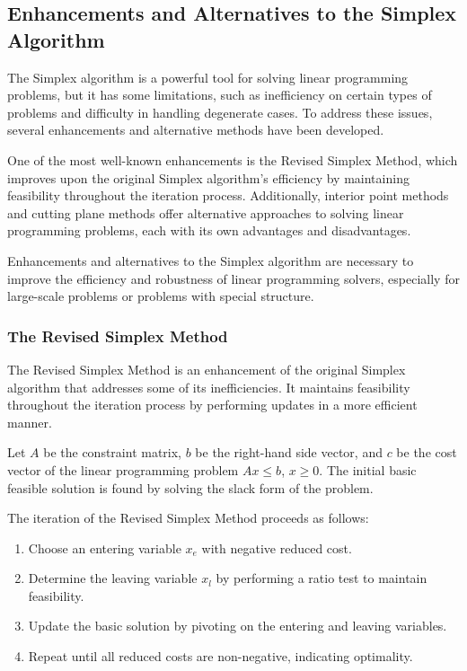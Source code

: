 \documentclass[12pt]{book} %
\begin{document}
\subsection{Enhancements and Alternatives to the Simplex Algorithm}
The Simplex algorithm is a powerful tool for solving linear programming problems, but it has some limitations, such as inefficiency on certain types of problems and difficulty in handling degenerate cases. To address these issues, several enhancements and alternative methods have been developed.

One of the most well-known enhancements is the Revised Simplex Method, which improves upon the original Simplex algorithm's efficiency by maintaining feasibility throughout the iteration process. Additionally, interior point methods and cutting plane methods offer alternative approaches to solving linear programming problems, each with its own advantages and disadvantages.

Enhancements and alternatives to the Simplex algorithm are necessary to improve the efficiency and robustness of linear programming solvers, especially for large-scale problems or problems with special structure.

\subsubsection{The Revised Simplex Method}
The Revised Simplex Method is an enhancement of the original Simplex algorithm that addresses some of its inefficiencies. It maintains feasibility throughout the iteration process by performing updates in a more efficient manner.

Let \(A\) be the constraint matrix, \(b\) be the right-hand side vector, and \(c\) be the cost vector of the linear programming problem \(Ax \leq b\), \(x \geq 0\). The initial basic feasible solution is found by solving the slack form of the problem.

The iteration of the Revised Simplex Method proceeds as follows:

\begin{enumerate}
    \item Choose an entering variable \(x_e\) with negative reduced cost.
    \item Determine the leaving variable \(x_l\) by performing a ratio test to maintain feasibility.
    \item Update the basic solution by pivoting on the entering and leaving variables.
    \item Repeat until all reduced costs are non-negative, indicating optimality.
\end{enumerate}
\end{document}
